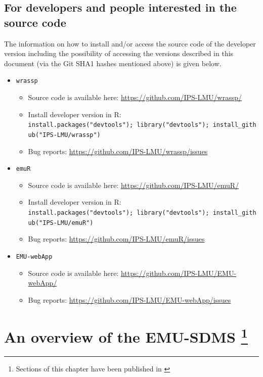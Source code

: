 \documentclass[]{book}
\providecommand{\tightlist}{%
  \setlength{\itemsep}{0pt}\setlength{\parskip}{0pt}}
\let\rmarkdownfootnote\footnote%
\def\footnote{\protect\rmarkdownfootnote}
\theoremstyle{definition}
\theoremstyle{definition}
\theoremstyle{definition}
\theoremstyle{remark}
\begin{document}
\section{For developers and people interested in the source
code}\label{for-developers-and-people-interested-in-the-source-code}

The information on how to install and/or access the source code of the
developer version including the possibility of accessing the versions
described in this document (via the Git SHA1 hashes mentioned above) is
given below.

\begin{itemize}
\tightlist
\item
  \texttt{wrassp}

  \begin{itemize}
  \tightlist
  \item
    Source code is available here:
    \url{https://github.com/IPS-LMU/wrassp/}
  \item
    Install developer version in R:
    \texttt{install.packages("devtools");\ library("devtools");\ install\_github("IPS-LMU/wrassp")}
  \item
    Bug reports: \url{https://github.com/IPS-LMU/wrassp/issues}
  \end{itemize}
\item
  \texttt{emuR}

  \begin{itemize}
  \tightlist
  \item
    Source code is available here:
    \url{https://github.com/IPS-LMU/emuR/}
  \item
    Install developer version in R:
    \texttt{install.packages("devtools");\ library("devtools");\ install\_github("IPS-LMU/emuR")}
  \item
    Bug reports: \url{https://github.com/IPS-LMU/emuR/issues}
  \end{itemize}
\item
  \texttt{EMU-webApp}

  \begin{itemize}
  \tightlist
  \item
    Source code is available here:
    \url{https://github.com/IPS-LMU/EMU-webApp/}
  \item
    Bug reports: \url{https://github.com/IPS-LMU/EMU-webApp/issues}
  \end{itemize}
\end{itemize}

\chapter[An overview of the EMU-SDMS ]{\texorpdfstring{An overview of
the EMU-SDMS \footnote{Sections of this chapter have been published in
  \citet{winkelmann:2017aa}}}{An overview of the EMU-SDMS }}\label{chap:overview}
\end{document}
